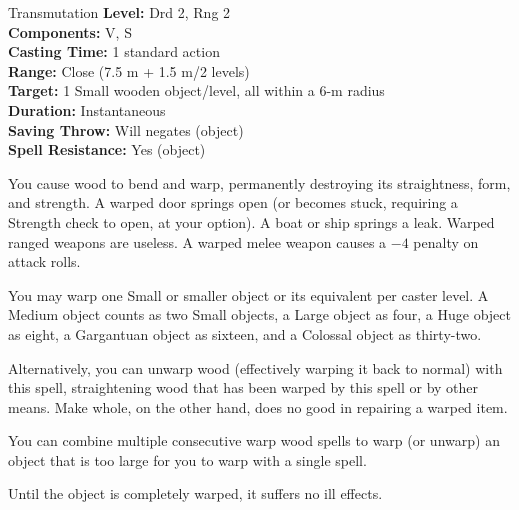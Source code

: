 {Transmutation}
{
	\textbf{Level:}
	Drd 2, Rng 2\\
	\textbf{Components:}
	V, S\\
	\textbf{Casting Time:}
	1 standard action\\
	\textbf{Range:}
	Close (7.5 m + 1.5 m/2 levels)\\
	\textbf{Target:}
	1 Small wooden object/level, all within a 6-m radius\\
	\textbf{Duration:}
	Instantaneous\\
	\textbf{Saving Throw:}
	Will negates (object)\\
	\textbf{Spell Resistance:}
	Yes (object)\\
}
{
	You cause wood to bend and warp, permanently destroying its straightness, form, and strength. A warped door springs open (or becomes stuck, requiring a Strength check to open, at your option). A boat or ship springs a leak. Warped ranged weapons are useless. A warped melee weapon causes a $-4$ penalty on attack rolls.

	You may warp one Small or smaller object or its equivalent per caster level. A Medium object counts as two Small objects, a Large object as four, a Huge object as eight, a Gargantuan object as sixteen, and a Colossal object as thirty-two.

	Alternatively, you can unwarp wood (effectively warping it back to normal) with this spell, straightening wood that has been warped by this spell or by other means. Make whole, on the other hand, does no good in repairing a warped item.

	You can combine multiple consecutive warp wood spells to warp (or unwarp) an object that is too large for you to warp with a single spell.

	Until the object is completely warped, it suffers no ill effects.

}
